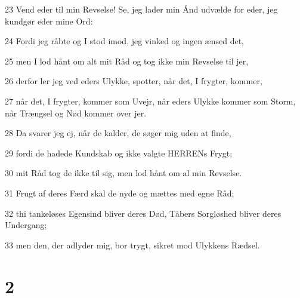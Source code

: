 \par 23 Vend eder til min Revselse! Se, jeg lader min Ånd udvælde for eder, jeg kundgør eder mine Ord:
\par 24 Fordi jeg råbte og I stod imod, jeg vinked og ingen ænsed det,
\par 25 men I lod hånt om alt mit Råd og tog ikke min Revselse til jer,
\par 26 derfor ler jeg ved eders Ulykke, spotter, når det, I frygter, kommer,
\par 27 når det, I frygter, kommer som Uvejr, når eders Ulykke kommer som Storm, når Trængsel og Nød kommer over jer.
\par 28 Da svarer jeg ej, når de kalder, de søger mig uden at finde,
\par 29 fordi de hadede Kundskab og ikke valgte HERRENs Frygt;
\par 30 mit Råd tog de ikke til sig, men lod hånt om al min Revselse.
\par 31 Frugt af deres Færd skal de nyde og mættes med egne Råd;
\par 32 thi tankeløses Egensind bliver deres Død, Tåbers Sorgløshed bliver deres Undergang;
\par 33 men den, der adlyder mig, bor trygt, sikret mod Ulykkens Rædsel.

\chapter{2}

